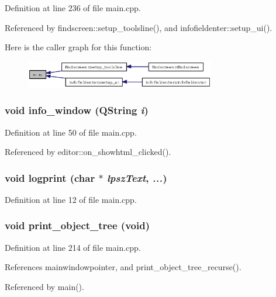 Definition at line 236 of file main.cpp.

Referenced by findscreen::setup\_\-toolsline(), and infofieldenter::setup\_\-ui().

Here is the caller graph for this function:\begin{figure}[H]
\begin{center}
\leavevmode
\includegraphics[width=235pt]{main_8h_6c9ac00d126f1109a583b5264a07412a_icgraph}
\end{center}
\end{figure}
\subsubsection{\setlength{\rightskip}{0pt plus 5cm}void info\_\-window (QString {\em i})}\label{main_8h_11a7110d2888630c2a28e17fcd3199fd}




Definition at line 50 of file main.cpp.

Referenced by editor::on\_\-showhtml\_\-clicked().
\subsubsection{\setlength{\rightskip}{0pt plus 5cm}void logprint (char $\ast$ {\em lpsz\-Text},  {\em ...})}\label{main_8h_e8160c24b0b45e234c5ad305d0d31a3b}




Definition at line 12 of file main.cpp.
\subsubsection{\setlength{\rightskip}{0pt plus 5cm}void print\_\-object\_\-tree (void)}\label{main_8h_8ff96661921f7c09201747e09d034951}




Definition at line 214 of file main.cpp.

References mainwindowpointer, and print\_\-object\_\-tree\_\-recurse().

Referenced by main().

